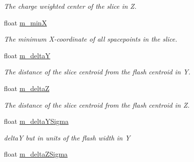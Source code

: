 \begin{DoxyCompactItemize}
\begin{DoxyCompactList}\small\item\em The charge weighted center of the slice in Z. \end{DoxyCompactList}\item 
float \hyperlink{classflashmatch_1_1FlashMatchingTool_1_1SliceCandidate_a4e1e999e5c4b7eee8288778f5036c5ad}{m\+\_\+minX}\hypertarget{classflashmatch_1_1FlashMatchingTool_1_1SliceCandidate_a4e1e999e5c4b7eee8288778f5036c5ad}{}\label{classflashmatch_1_1FlashMatchingTool_1_1SliceCandidate_a4e1e999e5c4b7eee8288778f5036c5ad}

\begin{DoxyCompactList}\small\item\em The minimum X-\/coordinate of all spacepoints in the slice. \end{DoxyCompactList}\item 
float \hyperlink{classflashmatch_1_1FlashMatchingTool_1_1SliceCandidate_a142d8f66a16d966ae6802c1c4bfd308f}{m\+\_\+deltaY}\hypertarget{classflashmatch_1_1FlashMatchingTool_1_1SliceCandidate_a142d8f66a16d966ae6802c1c4bfd308f}{}\label{classflashmatch_1_1FlashMatchingTool_1_1SliceCandidate_a142d8f66a16d966ae6802c1c4bfd308f}

\begin{DoxyCompactList}\small\item\em The distance of the slice centroid from the flash centroid in Y. \end{DoxyCompactList}\item 
float \hyperlink{classflashmatch_1_1FlashMatchingTool_1_1SliceCandidate_a4cbc8329d6d0b0d91a6e355ba6575840}{m\+\_\+deltaZ}\hypertarget{classflashmatch_1_1FlashMatchingTool_1_1SliceCandidate_a4cbc8329d6d0b0d91a6e355ba6575840}{}\label{classflashmatch_1_1FlashMatchingTool_1_1SliceCandidate_a4cbc8329d6d0b0d91a6e355ba6575840}

\begin{DoxyCompactList}\small\item\em The distance of the slice centroid from the flash centroid in Z. \end{DoxyCompactList}\item 
float \hyperlink{classflashmatch_1_1FlashMatchingTool_1_1SliceCandidate_a1b22351572f337e24d29009480f72ffc}{m\+\_\+delta\+Y\+Sigma}\hypertarget{classflashmatch_1_1FlashMatchingTool_1_1SliceCandidate_a1b22351572f337e24d29009480f72ffc}{}\label{classflashmatch_1_1FlashMatchingTool_1_1SliceCandidate_a1b22351572f337e24d29009480f72ffc}

\begin{DoxyCompactList}\small\item\em deltaY but in units of the flash width in Y \end{DoxyCompactList}\item 
float \hyperlink{classflashmatch_1_1FlashMatchingTool_1_1SliceCandidate_a9a4925e9509aefece6d65e7aecd21364}{m\+\_\+delta\+Z\+Sigma}\hypertarget{classflashmatch_1_1FlashMatchingTool_1_1SliceCandidate_a9a4925e9509aefece6d65e7aecd21364}{}\label{classflashmatch_1_1FlashMatchingTool_1_1SliceCandidate_a9a4925e9509aefece6d65e7aecd21364}


\end{DoxyCompactItemize}
